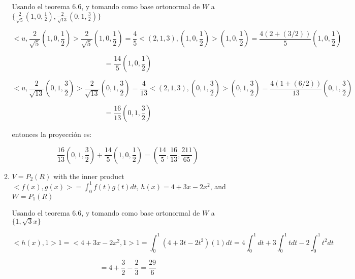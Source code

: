 \documentclass[12pt,a4paper]{article}
\begin{document}
\begin{enumerate}
\begin{enumerate}
        Usando el teorema 6.6, y tomando como base ortonormal de $W$ a $\{\frac{2}{\sqrt{5}} (1,0, \frac{1}{2}), \frac{2}{\sqrt{13}}(0,1,\frac{3}{2})\}$
        
        \begin{equation*}
            <u,\frac{2}{\sqrt{5}}(1,0, \frac{1}{2})> \frac{2}{\sqrt{5}}(1,0,\frac{1}{2}) =     \frac{4}{5}<(2,1,3),(1,0, \frac{1}{2})> (1,0,\frac{1}{2}) = \frac{4(2+ (3/2))}{5} (1,0, \frac{1}{2}) 
        \end{equation*}
        
        \begin{equation*}
            =  \frac{14}{5} (1,0,\frac{1}{2})
        \end{equation*}
        
        \begin{equation*}
            <u,\frac{2}{\sqrt{13}}(0,1, \frac{3}{2})> \frac{2}{\sqrt{13}}(0,1,\frac{3}{2}) =     \frac{4}{13}<(2,1,3),(0,1, \frac{3}{2})> (0,1,\frac{3}{2}) = \frac{4(1+ (6/2))}{13} (0,1, \frac{3}{2})
        \end{equation*}
        
        \begin{equation*}
             =\frac{16}{13} (0,1,\frac{3}{2}) 
        \end{equation*}
        
        entonces la proyección es:
        
        \begin{equation*}
             \frac{16}{13} (0,1,\frac{3}{2}) + \frac{14}{5} (1,0,\frac{1}{2})= (\frac{14}{5}, \frac{16}{13}, \frac{211}{65})
        \end{equation*}
        
        
        
        \item $V = P_2(R)$ with the inner product $<f(x),g(x)>=\int_{0}^{1} f(t) g(t) dt$, $h(x) =4 +3x-2x^2$, and $W = P_1 (R)$
        
        Usando el teorema 6.6, y tomando como base ortonormal de $W$ a $\{1, \sqrt{3} x\}$
        
        
        
        \begin{equation*}
            <h(x), 1> 1 = <4 +3x-2x^2,1> 1 = \int_{0}^{1} (4 +3t-2t^2) (1) dt = 4 \int_{0}^{1} dt + 3 \int_{0}^{1} tdt - 2 \int_{0}^{1} t^2 dt   
        \end{equation*}
        
        \begin{equation*}
            = 4+\frac{3}{2} - \frac{2}{3} = \frac{29}{6}
        \end{equation*}
        

\end{enumerate}
\end{enumerate}
\end{document}
